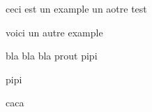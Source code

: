 \beguindocument
ceci est un example
un aotre test

voici un autre example

bla bla bla
prout
pipi

pipi

caca
